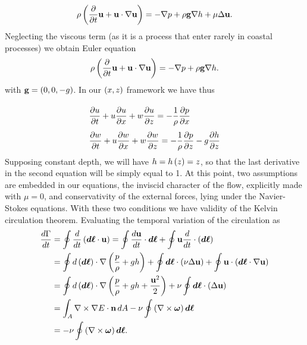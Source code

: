 \begin{equation}
\rho\left( \dfrac{\partial}{\partial t}\mathbf{u} + \mathbf{u}\cdot\nabla\mathbf{u} \right)=-\nabla p +\rho\mathbf{g}\nabla h+\mu\Delta\mathbf{u}.
\end{equation}
Neglecting the viscous term (as it is a process that enter rarely in coastal processes) we obtain Euler equation
\begin{equation}
\rho\left( \dfrac{\partial}{\partial t}\mathbf{u} + \mathbf{u}\cdot\nabla\mathbf{u} \right)=-\nabla p +\rho\mathbf{g}\nabla h.
\end{equation}
with $\mathbf{g}=\left( 0,0,-g \right)$. In our $\left( x,z \right)$ framework we have thus
\begin{equation}
\begin{array}{l}
\vphantom{\int^{\dfrac{1}{2}}}\dfrac{\partial u}{\partial t} + u \dfrac{\partial u}{\partial x} + w \dfrac{\partial u}{\partial z}=-\dfrac{1}{\rho}\dfrac{\partial p}{\partial x} \\
\vphantom{\int^{\dfrac{1}{2}}}\dfrac{\partial w}{\partial t} + u \dfrac{\partial w}{\partial x} + w \dfrac{\partial w}{\partial z}=-\dfrac{1}{\rho}\dfrac{\partial p}{\partial z}-g\dfrac{\partial h}{\partial z}
\end{array}
\end{equation}
Supposing constant depth, we will have $h=h\left( z \right)=z$, so that the last derivative in the second equation will be simply equal to 1. At this point, two assumptions are embedded in our equations, the inviscid character of the flow, explicitly made with $\mu=0$, and conservativity of the external forces, lying under the Navier-Stokes equations. With these two conditions we have validity of the Kelvin circulation theorem. Evaluating the temporal variation of the circulation as
\begin{align*}
\dfrac{d\Gamma}{dt}&=\oint \dfrac{d}{dt}\left( \boldsymbol{d\ell}\cdot\mathbf{u} \right)=\oint \dfrac{d\mathbf{u}}{dt}\cdot\boldsymbol{d\ell}+\oint\mathbf{u}\dfrac{d}{dt}\cdot\left( \boldsymbol{d\ell} \right)\\
&=\oint d\left( \boldsymbol{d\ell} \right)\cdot\nabla\left( \dfrac{p}{\rho}+gh \right)+\oint \boldsymbol{d\ell}\cdot \left( \nu\Delta\mathbf{u} \right) + \oint\mathbf{u}\cdot\left( \boldsymbol{d\ell}\cdot\nabla\mathbf{u} \right)\\
&=\oint d\left( \boldsymbol{d\ell} \right)\cdot\nabla\left( \dfrac{p}{\rho}+gh+\dfrac{\mathbf{u}^{2}}{2} \right)+\nu\oint \boldsymbol{d\ell}\cdot \left( \Delta\mathbf{u} \right)\\
&=\int_{A}\nabla\times\nabla E\cdot\mathbf{n}\, dA-\nu\oint\left( \nabla\times\boldsymbol{\omega} \right)\boldsymbol{d\ell}\\
&=-\nu\oint\left( \nabla\times\boldsymbol{\omega} \right)\boldsymbol{d\ell}.
\end{align*}
